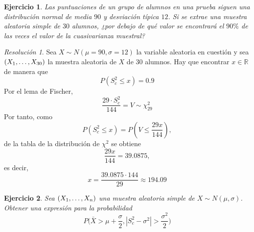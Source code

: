 \documentclass[11pt]{report}
\newcommand{\R}{\mathbb R}
\newtheorem{exercise}{Ejercicio}
\theoremstyle{remark}
\newtheorem*{resolution}{Resolución}
\begin{document}
\begin{exercise}
Las puntuaciones de un grupo de alumnos en una prueba siguen una distribución normal de media $90$ y desviación típica $12$. Si se extrae una muestra aleatoria simple de $30$ alumnos, ¿por debajo de qué valor se encontrará el $90\%$ de las veces el valor de la cuasivarianza muestral?
\end{exercise}

\begin{resolution}
Sea $X \sim N(\mu=90,\sigma=12)$ la variable aleatoria en cuestión y sea $(X_1,\mathellipsis,X_{30})$ la muestra aleatoria de $X$ de 30 alumnos. Hay que encontrar $x \in \R$ de manera que
\[P(S^2_c \leq x) = 0.9\]
Por el lema de Fischer,
\[\frac{29 \cdot S^2_c}{144} = V \sim \chi^2_{29}\]
Por tanto, como
\[P(S^2_c \leq x) = P(V \leq \frac{29x}{144}),\]
de la tabla de la distribución de $\chi^2$ se obtiene
\[\frac{29x}{144}=39.0875,\]
es decir,
\[x = \frac{39.0875 \cdot 144}{29} \approx 194.09\]
\end{resolution}

\begin{exercise}
Sea $(X_1,\mathellipsis,X_n)$ una muestra aleatoria simple de $X \sim N(\mu,\sigma)$. Obtener una expresión para la probabilidad
\[P\bigl(\bar{X}>\mu+\frac{\sigma}{2},|S^2_c-\sigma^2|> \frac{\sigma^2}{2}\bigr)\]
\end{exercise}
\end{document}
